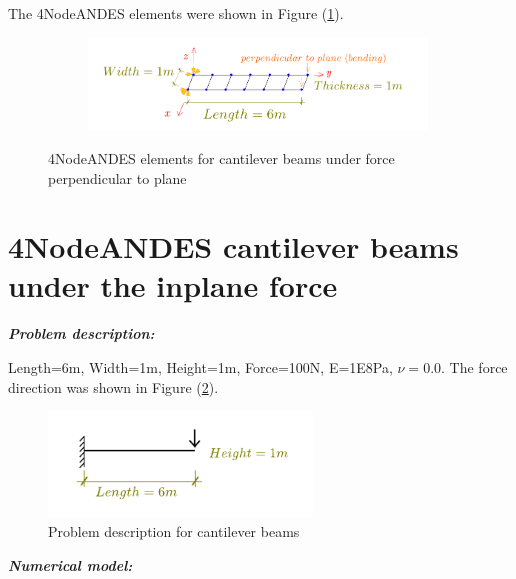 \documentclass[fleqn,11pt,letter]{article}
\begin{document}
The 4NodeANDES elements were shown in Figure (\ref{fig 4NodeANDES elements for cantilever beams under force perpendicular to plane}).

\begin{figure}[H]
  \centering
  \begin{subfigure}{0.5\textwidth}
    \centering
    \includegraphics[width=9cm]{../Figure_files/4NodeANDES/beam_ANDES_xy_bending_6div.pdf}
  \end{subfigure}
  \captionsetup{justification=centering,margin=3cm}
  \caption{4NodeANDES elements for cantilever beams under force perpendicular to plane}
  \label{fig 4NodeANDES elements for cantilever beams under force perpendicular to plane}
\end{figure}









\newpage
\section{4NodeANDES cantilever beams under the inplane force}



\emph{\textbf{Problem description:}}

Length=6m, Width=1m, Height=1m, Force=100N, E=1E8Pa, $\nu=0.0$. The force direction was shown in Figure (\ref{fig Problem description for cantilever 4 2}). 

\begin{figure}[H]
  \centering
  \includegraphics[width=7cm]{../Figure_files/4NodeANDES/cantilever_6.pdf}
  \caption{Problem description for cantilever beams}
  \label{fig Problem description for cantilever 4 2}
\end{figure}


\noindent \emph{\textbf{Numerical model:}}
\end{document}
